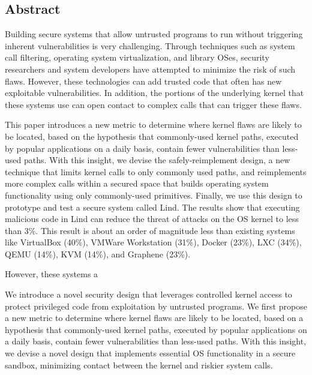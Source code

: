 \subsection*{Abstract}
Building secure systems that allow untrusted programs to run without
triggering inherent vulnerabilities %
is very challenging.
Through techniques such as system call filtering,
operating system virtualization, and library OSes, security researchers
and system developers have attempted to minimize the risk of such flaws.
However, these technologies can add trusted code that often has new
exploitable vulnerabilities. In addition, the portions of the underlying kernel
that these systems use can open contact to complex calls that can trigger these
flaws.

This paper introduces a new metric to determine where kernel flaws are
likely to be located, based on the  hypothesis that commonly-used kernel
paths, executed by popular applications on a daily basis, contain fewer
vulnerabilities than less-used paths. With this insight, we devise the
safely-reimplement design, a new technique that limits kernel calls to only
commonly used paths, and reimplements more complex calls within a secured space
that builds operating system functionality
using only commonly-used primitives.
Finally, we use this design to prototype and test a secure system called Lind.
The results show that executing malicious code in Lind can reduce the threat
of attacks on the OS kernel to less than 3\%.
This result is about an order of magnitude less than existing systems like VirtualBox (40\%),
VMWare Workstation (31\%), Docker (23\%), LXC (34\%), QEMU (14\%), KVM (14\%), and Graphene (23\%).



However,
these systems a

We introduce a novel security design that leverages
controlled kernel access to protect privileged code from exploitation by
untrusted programs.
We first propose a new metric to determine where kernel flaws are
likely to be located, based on a hypothesis that commonly-used kernel
paths, executed by popular applications on a daily basis, contain fewer
vulnerabilities than less-used paths. With this insight, we devise a
novel design that implements essential OS functionality in  a
secure sandbox, minimizing contact between the kernel and riskier system calls.
